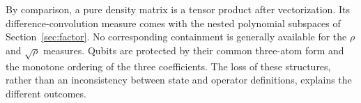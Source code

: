 By comparison, a pure density matrix is a tensor product after
vectorization. Its difference-convolution measure comes with the nested
polynomial subspaces of Section~\ref{sec:factor}. No corresponding
containment is generally available for the $\rho$ and $\sqrt\rho$
measures. Qubits are protected by their common three-atom form and the
monotone ordering of the three coefficients. The loss of these structures,
rather than an inconsistency between state and operator definitions,
explains the different outcomes.
